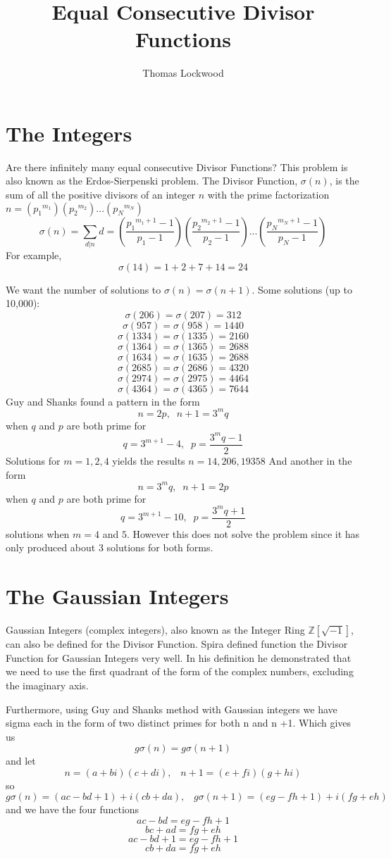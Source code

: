 \documentclass[12pt]{amsart}
\title{Equal Consecutive Divisor Functions}
\author{Thomas Lockwood}
\begin{document}
\maketitle
\thispagestyle{empty}


\section{The Integers}
Are there infinitely many equal consecutive Divisor Functions? This problem is also known as the Erdos-Sierpenski problem. The Divisor Function, $\sigma(n)$, is the sum of all the positive divisors of an integer $n$ with the prime factorization $n = ({p_1}^{m_1})({p_2}^{m_2})...({p_N}^{m_N})$ $$\sigma(n) = \sum_{d|{n}}d = (\frac{{p_1}^{m_1+1} - 1} {{p_1} - 1}) (\frac{{p_2}^{m_2+1} - 1}{{p_2} - 1})... (\frac{{p_N}^{m_N+1} - 1}{{p_N} - 1}) $$ For example, $$\sigma(14) = 1 + 2 + 7 + 14 = 24$$

We want the number of solutions to $\sigma(n) = \sigma(n+1)$. Some solutions (up to 10,000):
\\
$$\sigma(206) = \sigma(207) = 312$$
$$\sigma(957) = \sigma(958) = 1440$$
$$\sigma(1334) = \sigma(1335) = 2160$$
$$\sigma(1364) = \sigma(1365) = 2688$$
$$\sigma(1634) = \sigma(1635) = 2688$$
$$\sigma(2685) = \sigma(2686) = 4320$$
$$\sigma(2974) = \sigma(2975) = 4464$$
$$\sigma(4364) = \sigma(4365) = 7644$$
Guy and Shanks found a pattern in the form $$n = 2p,\; \; n + 1 = 3^{m}q$$ when $q$ and $p$ are both prime for $$q = 3^{m+1} - 4, \; \; p=\frac{3^{m}q-1} {2}$$ Solutions for $m = 1, 2, 4$ yields the results $n = 14, 206, 19358$
And another in the form $$n = 3^{m}q, \; \; n+1 = 2p$$ when $q$ and $p$ are both prime for $$q = 3^{m+1} - 10, \; \; p = \frac{3^{m}q + 1} {2}$$  solutions when $m = 4$ and $5$. However this does not solve the problem since it has only produced about 3 solutions for both forms.

\section{The Gaussian Integers}
Gaussian Integers (complex integers), also known as the Integer Ring $\mathds{Z}[\sqrt{-1}]$, can also be defined for the Divisor Function. Spira defined function the Divisor Function for Gaussian Integers very well. In his definition he demonstrated that we need to use the first quadrant of the form of the complex numbers, excluding the imaginary axis. 

Furthermore, using Guy and Shanks method with Gaussian integers we have sigma each in the form of two distinct primes for both n and n +1. Which gives us $$g\sigma(n) = g\sigma(n+1)$$
and let $$n = (a + bi)(c+di), \; \; \; n+1 = (e + fi)(g + hi)$$ so $$ g\sigma(n) = (ac -bd + 1) + i(cb + da) , \; \; \; g\sigma(n+1) = (eg - fh + 1) + i(fg + eh)$$ and we have the four functions $$ac -bd = eg -fh + 1$$ $$bc + ad = fg + eh$$ $$ac - bd + 1 = eg - fh + 1$$ $$cb + da = fg + eh$$
\end{document}

